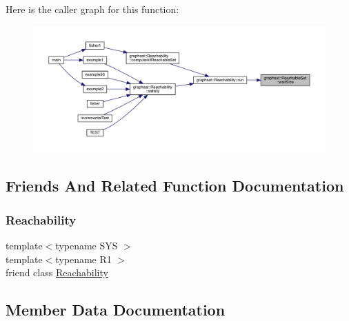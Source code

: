 Here is the caller graph for this function\+:
\nopagebreak
\begin{figure}[H]
\begin{center}
\leavevmode
\includegraphics[width=350pt]{classgraphsat_1_1_reachable_set_a7825d544d345f8fa18ad1780abe92d5d_icgraph}
\end{center}
\end{figure}


\subsection{Friends And Related Function Documentation}
\mbox{\label{classgraphsat_1_1_reachable_set_ac274586d6140dff44fa1029371c2cf48}} 
\subsubsection{\texorpdfstring{Reachability}{Reachability}}
{\footnotesize\ttfamily template$<$typename S\+YS $>$ \\
template$<$typename R1 $>$ \\
friend class \mbox{\hyperlink{classgraphsat_1_1_reachability}{Reachability}}\hspace{0.3cm}{\ttfamily [friend]}}



\subsection{Member Data Documentation}
\mbox{\label{classgraphsat_1_1_reachable_set_a973d91fb3ba4a6f816da5635b4e4c17f}} 
